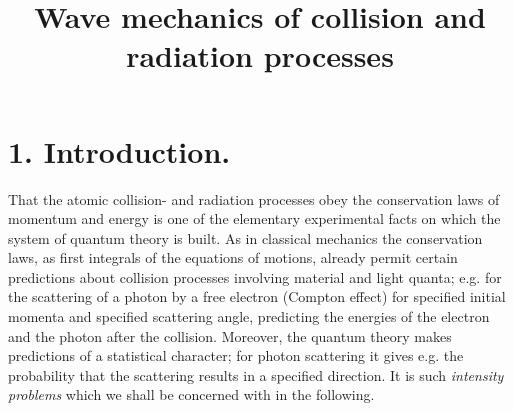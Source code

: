 \documentclass{report}
\title{Wave mechanics of collision and radiation processes}
\begin{document}
\section*{1. Introduction.}
That the atomic collision- and radiation processes obey the conservation laws of momentum and energy is one of the elementary experimental facts on which the system of quantum theory is built. As in classical mechanics the conservation laws, as first integrals of the equations of motions, already permit certain predictions about collision processes involving material and light quanta; e.g. for the scattering of a photon by a free electron (Compton effect) for specified initial momenta and specified scattering angle, predicting the energies of the electron and the photon after the collision. Moreover, the quantum theory makes predictions of a statistical character; for photon scattering it gives e.g. the probability that the scattering results in a specified direction. It is such \textit{intensity problems} which we shall be concerned with in the following.
\end{document}
